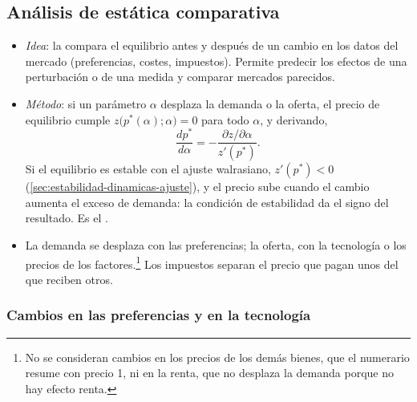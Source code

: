 \documentclass[11pt]{article}
\begin{document}
\subsection{Análisis de estática comparativa}\label{sec:analisis-estatica-comparativa}

\begin{itemize}
\item \emph{Idea}: la  compara el equilibrio antes y después de un cambio en los datos del mercado (preferencias, costes, impuestos). Permite predecir los efectos de una perturbación o de una medida y comparar mercados parecidos.
\item \emph{Método}: si un parámetro $\alpha$ desplaza la demanda o la oferta, el precio de equilibrio cumple $z\big(p^*(\alpha);\alpha\big)=0$ para todo $\alpha$, y derivando,
  \begin{equation}
  \frac{dp^*}{d\alpha}=-\frac{\partial z/\partial\alpha}{z'(p^*)}. \label{eq:estatica}
  \end{equation}
  Si el equilibrio es estable con el ajuste walrasiano, $z'(p^*)<0$ (\ref{sec:estabilidad-dinamicas-ajuste}), y el precio sube cuando el cambio aumenta el exceso de demanda: la condición de estabilidad da el signo del resultado. Es el \nocite{Samuelson1941Stability,Samuelson1947Foundations}.
\item La demanda se desplaza con las preferencias; la oferta, con la tecnología o los precios de los factores.\footnote{No se consideran cambios en los precios de los demás bienes, que el numerario resume con precio 1, ni en la renta, que no desplaza la demanda porque no hay efecto renta.} Los impuestos separan el precio que pagan unos del que reciben otros.
\end{itemize}

\subsubsection{Cambios en las preferencias y en la tecnología}\label{sec:cambios-preferencias-tecnologia}
\end{document}
